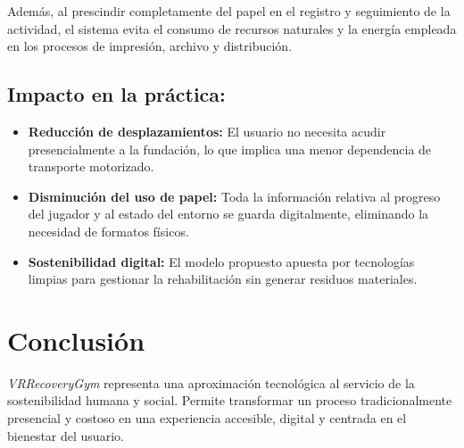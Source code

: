 Además, al prescindir completamente del papel en el registro y seguimiento de la actividad, el sistema evita el consumo de recursos naturales y la energía empleada en los procesos de impresión, archivo y distribución.

\subsection*{Impacto en la práctica:}
\begin{itemize}
  \item \textbf{Reducción de desplazamientos:} El usuario no necesita acudir presencialmente a la fundación, lo que implica una menor dependencia de transporte motorizado.
  \item \textbf{Disminución del uso de papel:} Toda la información relativa al progreso del jugador y al estado del entorno se guarda digitalmente, eliminando la necesidad de formatos físicos.
  \item \textbf{Sostenibilidad digital:} El modelo propuesto apuesta por tecnologías limpias para gestionar la rehabilitación sin generar residuos materiales.
\end{itemize}

\section{Conclusión}
\textit{VRRecoveryGym} representa una aproximación tecnológica al servicio de la sostenibilidad humana y social. Permite transformar un proceso tradicionalmente presencial y costoso en una experiencia accesible, digital y centrada en el bienestar del usuario.
